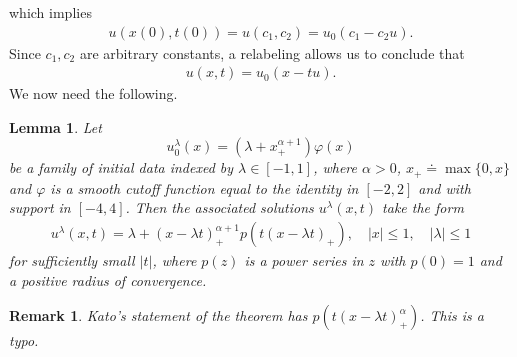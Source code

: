 \documentclass[12pt,reqno]{amsart}
\numberwithin{equation}{section}  %
\numberwithin{figure}{section}
\newcommand{\vp}{\varphi}
\newtheorem{lemma}[theorem]{Lemma}
\newtheorem{remark}[theorem]{Remark}
\begin{document}
%
which implies
%
%
\begin{equation*}
\begin{split}
  u(x(0), t(0)) = u(c_{1}, c_{2}) = u_{0}(c_{1} - c_{2}u). 
\end{split}
\end{equation*}
%
%
%
Since $c_{1}, c_{2}$ are arbitrary constants, a relabeling allows us to conclude that
%
%
%
%
\begin{equation*}
\begin{split}
u(x,t) = u_{0}(x - tu).
\end{split}
\end{equation*}
%
%
We now need the following.
%
%
%
%
%
%
%
%
\begin{lemma}
%
Let 
\begin{equation}
  \label{key-init-data}
  u_{0}^{\lambda}(x) = (\lambda +
x_{+}^{\alpha + 1}) \vp(x)
\end{equation}
be a family of initial data indexed by $\lambda \in
[-1, 1]$, where $\alpha > 0$, $x_{+} \doteq \max\{0, x\}$ and $\vp$ is a smooth cutoff
function equal to the identity in $[-2, 2]$ and with support in $[-4,4]$. Then the associated solutions $u^{\lambda}(x,t)$ take the form
\begin{equation}
    \label{u-lam-explicit-form}
    \begin{split}
        u^{\lambda}(x,t) = \lambda + (x - \lambda
        t)^{\alpha + 1}_{+} p(t(x- \lambda
        t)_{+}), \quad | x | \le 1, \quad
        | \lambda | \le 1
    \end{split}
\end{equation}
%
%
for sufficiently small $| t |$, where $p(z)$ is a power series in $z$ with $p(0) =1$ and a positive radius of convergence.
\label{lem:sol-burg}
\end{lemma}
%
%
\begin{framed}
%
%
\begin{remark}
Kato's statement of the theorem has $p(t(x - \lambda t)^{\alpha}_{+})$. This is a typo.
\label{rem:kato-typo}
\end{remark}
%
%
\end{framed}
%
%
\end{document}
